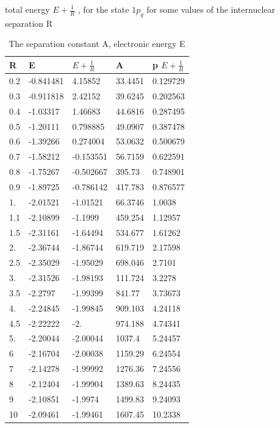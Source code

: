 \begin{table}[h!]
  \caption{ The separation constant A, electronic energy E}{ total energy $ E + \frac{1}{R} $ , for the state $ 1p_g $ for some values of the internuclear separation R } 
  \centering
  \label{2sg}
		\begin{tabular}{ m{6em} m{6em}  m{6em}  m{6em} m{6em} }
			\hline
			R & E & $ E + \frac{1}{R} $ & A & p $ E + \frac{1}{R} $ \\ \hline \hline
  0.2 & -0.841481 & 4.15852 & 33.4451 & 0.129729\\
  0.3 & -0.911818 & 2.42152 & 39.6245 & 0.202563\\
  0.4 & -1.03317 & 1.46683 & 44.6816 & 0.287495\\
  0.5 & -1.20111 & 0.798885 & 49.0907 & 0.387478\\
  0.6 & -1.39266 & 0.274004 & 53.0632 & 0.500679\\
  0.7 & -1.58212 & -0.153551 & 56.7159 & 0.622591\\
  0.8 & -1.75267 & -0.502667 & 395.73 & 0.748901\\
  0.9 & -1.89725 & -0.786142 & 417.783 & 0.876577\\
  1. & -2.01521 & -1.01521 & 66.3746 & 1.0038\\
  1.1 & -2.10899 & -1.1999 & 459.254 & 1.12957\\
  1.5 & -2.31161 & -1.64494 & 534.677 & 1.61262\\
  2. & -2.36744 & -1.86744 & 619.719 & 2.17598\\
  2.5 & -2.35029 & -1.95029 & 698.046 & 2.7101\\
  3. & -2.31526 & -1.98193 & 111.724 & 3.2278\\
  3.5 & -2.2797 & -1.99399 & 841.77 & 3.73673\\
  4. & -2.24845 & -1.99845 & 909.103 & 4.24118\\
  4.5 & -2.22222 & -2. & 974.188 & 4.74341\\
  5. & -2.20044 & -2.00044 & 1037.4 & 5.24457\\
  6 & -2.16704 & -2.00038 & 1159.29 & 6.24554\\
  7 & -2.14278 & -1.99992 & 1276.36 & 7.24556\\
  8 & -2.12404 & -1.99904 & 1389.63 & 8.24435\\
  9 & -2.10851 & -1.9974 & 1499.83 & 9.24093\\
  10 & -2.09461 & -1.99461 & 1607.45 & 10.2338\\
		\hline
		\end{tabular}
\end{table}


